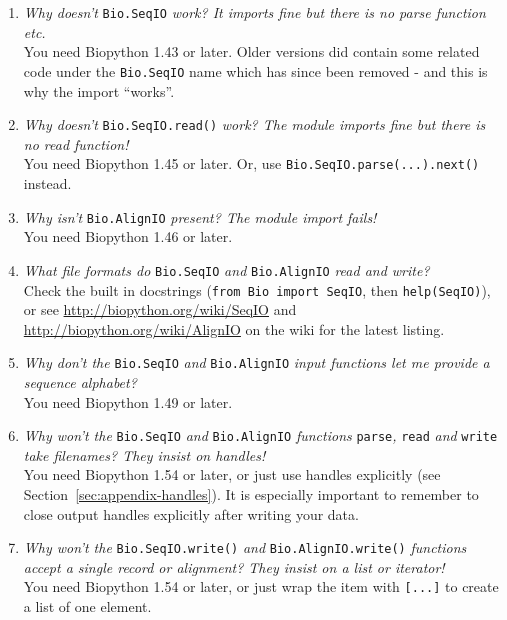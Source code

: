 \documentclass{report}
\begin{document}
\begin{enumerate}
  \item \emph{Why doesn't} \verb|Bio.SeqIO| \emph{work? It imports fine but there is no parse function etc.} \\
  You need Biopython 1.43 or later.  Older versions did contain some related code under the \verb|Bio.SeqIO| name which has since been removed - and this is why the import ``works''.

  \item \emph{Why doesn't} \verb|Bio.SeqIO.read()| \emph{work? The module imports fine but there is no read function!} \\
  You need Biopython 1.45 or later.  Or, use \texttt{Bio.SeqIO.parse(...).next()} instead.

  \item \emph{Why isn't} \verb|Bio.AlignIO| \emph{present? The module import fails!} \\
  You need Biopython 1.46 or later.

  \item \emph{What file formats do} \verb|Bio.SeqIO| \emph{and} \verb|Bio.AlignIO| \emph{read and write?} \\
  Check the built in docstrings (\texttt{from Bio import SeqIO}, then \texttt{help(SeqIO)}), or see \url{http://biopython.org/wiki/SeqIO} and \url{http://biopython.org/wiki/AlignIO} on the wiki for the latest listing.
  
  \item \emph{Why don't the } \verb|Bio.SeqIO| \emph{and} \verb|Bio.AlignIO| \emph{input functions let me provide a sequence alphabet?} \\
  You need Biopython 1.49 or later.

  \item \emph{Why won't the } \verb|Bio.SeqIO| \emph{and} \verb|Bio.AlignIO| \emph{functions} \verb|parse|\emph{,} \verb|read| \emph{and} \verb|write| \emph{take filenames? They insist on handles!} \\
  You need Biopython 1.54 or later, or just use handles explicitly (see Section~\ref{sec:appendix-handles}).
  It is especially important to remember to close output handles explicitly after writing your data.

  \item \emph{Why won't the } \verb|Bio.SeqIO.write()| \emph{and} \verb|Bio.AlignIO.write()| \emph{functions accept a single record or alignment? They insist on a list or iterator!} \\
  You need Biopython 1.54 or later, or just wrap the item with \verb|[...]| to create a list of one element.


\end{enumerate}
\end{document}
